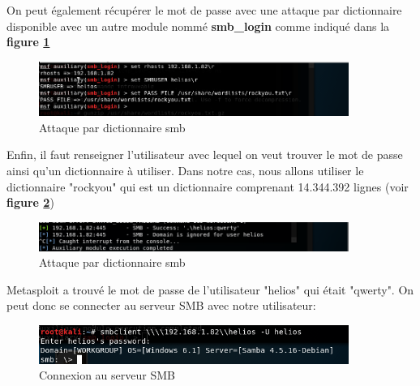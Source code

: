 On peut également récupérer le mot de passe avec une attaque par dictionnaire disponible avec un autre module nommé \textbf{smb\_login} comme indiqué dans la \textbf{figure \ref{fig:attaque-smb-dic}}

\begin{figure}[]
  \centering
  \setlength\figureheight{7cm}
  \setlength\figurewidth{9cm}
  \includegraphics[width=0.9\textwidth]{oui/Ancien/imangeancien/msf_smb_pass.PNG}
  \caption{Attaque par dictionnaire smb}
  \label{fig:attaque-smb-dic}
\end{figure}
Enfin, il faut renseigner l'utilisateur avec lequel on veut trouver le mot de passe ainsi qu'un dictionnaire à utiliser. Dans notre cas, nous allons utiliser le dictionnaire "rockyou" qui est un dictionnaire comprenant 14.344.392 lignes (voir \textbf{figure \ref{fig:smb-dic-2}})\\

\begin{figure}[]
  \centering
  \setlength\figureheight{7cm}
  \setlength\figurewidth{9cm}
  \includegraphics[width=0.9\textwidth]{oui/Ancien/imangeancien/msf_smb_pass2.PNG}
  \caption{Attaque par dictionnaire smb}
  \label{fig:smb-dic-2}
\end{figure}

Metasploit a trouvé le mot de passe de l'utilisateur "helios" qui était "qwerty". On peut donc se connecter au serveur SMB avec notre utilisateur:

\begin{figure}[h]
  \centering
  \setlength\figureheight{7cm}
  \setlength\figurewidth{9cm}
  \includegraphics[width=0.9\textwidth]{oui/Ancien/imangeancien/msf_smb_pass3.PNG}
  \caption{Connexion au serveur SMB}
  \label{fig:courbe-tikz}
\end{figure}